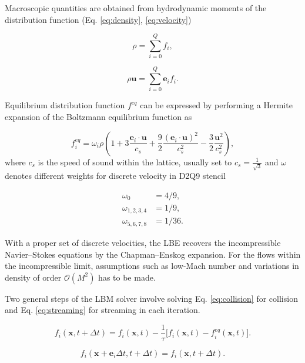 Macroscopic quantities are obtained from hydrodynamic moments of the distribution function (Eq. \ref{eq:density}, \ref{eq:velocity})

\begin{equation}
	\label{eq:density}
	\rho = \sum_{i=0}^{Q}f_i,
\end{equation}

\begin{equation}
	\label{eq:velocity}
	\rho\bm{u} = \sum_{i=0}^{Q} \bm{e}_i  f_i .
\end{equation}

Equilibrium distribution function $f^{eq}$ can be expressed by performing a Hermite expansion of the Boltzmann equilibrium function as

\begin{equation}
	\label{eq:feq}
	f_i^{eq} = \omega_i \rho \left( 1+3\frac{\bm{e}_i \cdot \bm{u}}{c_s} + \frac{9}{2}\frac{(\bm{e}_i \cdot \bm{u})^2}{c_s^2}-\frac{3}{2}\frac{\bm{u}^2}{c_s^2}\right),
\end{equation}
where $c_s$ is the speed of sound within the lattice, usually set to $c_s = \frac{1}{\sqrt{3}}$ and $\omega$ denotes different weights for discrete velocity in D2Q9 stencil

\begin{align}
	\label{weights}
	\omega_0 &= 4/9,\\
	\omega_{1,2,3,4} &= 1/9,\\
	\omega_{5,6,7,8} &= 1/36.
\end{align}

With a proper set of discrete velocities, the LBE recovers the incompressible Navier–Stokes equations by the Chapman–Enskog expansion. For the flows within the incompressible limit, assumptions such as low-Mach number and variations in density of order $\mathcal{O}(M^2)$ has to be made.

Two general steps of the LBM solver involve solving  Eq. \ref{eq:collision} for collision and Eq. \ref{eq:streaming} for streaming in each iteration.

\begin{equation}
	\label{eq:collision}
	f_i (\bm{x},t+\Delta t) = f_i (\bm{x},t)-\frac{1}{\tau}\Big[f_i (\bm{x},t) - f_i^{eq} (\bm{x},t)\Big].
\end{equation}

\begin{equation}
	\label{eq:streaming}
	f_i (\bm{x}+\bm{e}_i\Delta t,t+\Delta t) = f_i (\bm{x},t+\Delta t).
\end{equation}

